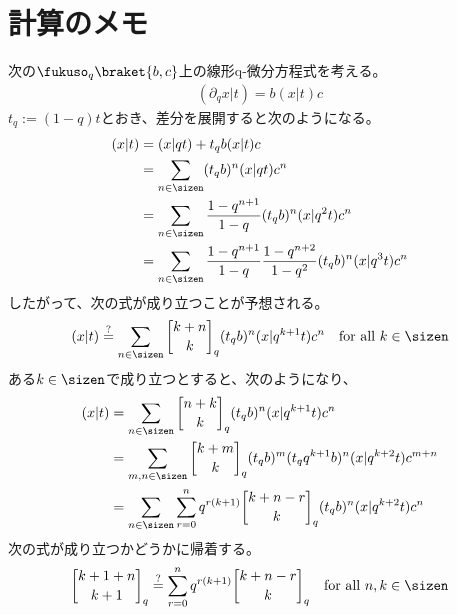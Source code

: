 {\section{計算のメモ}\label{s1:計算のメモ} %
	次の$\fukuso_q\braket{b,c}$上の線形q-微分方程式を考える。
	\begin{equation}\label{eq:線形q-微分方程式}\begin{split}
		(\partial_qx|t) = b(x|t)c
	\end{split}\end{equation}
	$t_q:=(1-q)t$とおき、差分を展開すると次のようになる。
	\begin{equation*}\begin{split}
		(x|t) &= (x|qt) + t_qb(x|t)c \\
		&= \sum_{n\in\sizen} (t_qb)^n(x|qt)c^n \\
		&= \sum_{n\in\sizen} \frac{1-q^{n+1}}{1-q}(t_qb)^n(x|q^2t)c^n \\
		&= \sum_{n\in\sizen} \frac{1-q^{n+1}}{1-q}\frac{1-q^{n+2}}{1-q^2}
			(t_qb)^n(x|q^3t)c^n \\
	\end{split}\end{equation*}
	したがって、次の式が成り立つことが予想される。
	\begin{equation*}\begin{split}
		(x|t) \overset{?}{=} 
		\sum_{n\in\sizen}\qbinom{k+n}{k}_q(t_qb)^n(x|q^{k+1}t)c^n
		\quad\text{for all } k\in\sizen
	\end{split}\end{equation*}
	ある$k\in\sizen$で成り立つとすると、次のようになり、
	\begin{equation*}\begin{split}
		(x|t) &= \sum_{n\in\sizen} \qbinom{n+k}{k}_q(t_qb)^n(x|q^{k+1}t)c^n \\
		&= \sum_{m,n\in\sizen} \qbinom{k+m}{k}_q(t_qb)^m(t_qq^{k+1}b)^n
			(x|q^{k+2}t)c^{m+n} \\
		&= \sum_{n\in\sizen}\sum_{r=0}^n q^{r(k+1)}\qbinom{k+n-r}{k}_q(t_qb)^n
			(x|q^{k+2}t)c^n \\
	\end{split}\end{equation*}
	次の式が成り立つかどうかに帰着する。
	\begin{equation*}\begin{split}
		\qbinom{k+1+n}{k+1}_q \overset{?}{=} \sum_{r=0}^n 
			q^{r(k+1)}\qbinom{k+n-r}{k}_q \quad\text{for all } n,k\in\sizen
	\end{split}\end{equation*}
}

